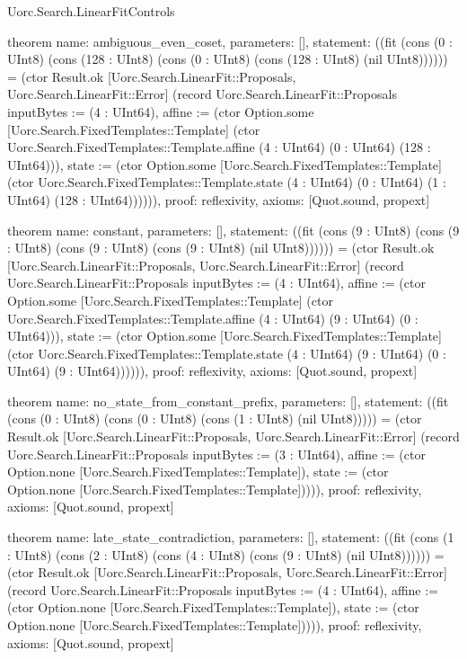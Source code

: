 \begin{lexlean}{Uorc.Search.LinearFitControls}
\begin{semanticmodule}
theorem{
  name: ambiguous_even_coset,
  parameters: [],
  statement: ((fit (cons (0 : UInt8) (cons (128 : UInt8) (cons (0 : UInt8) (cons (128 : UInt8) (nil UInt8)))))) = (ctor Result.ok [Uorc.Search.LinearFit::Proposals, Uorc.Search.LinearFit::Error] (record Uorc.Search.LinearFit::Proposals {inputBytes := (4 : UInt64), affine := (ctor Option.some [Uorc.Search.FixedTemplates::Template] (ctor Uorc.Search.FixedTemplates::Template.affine (4 : UInt64) (0 : UInt64) (128 : UInt64))), state := (ctor Option.some [Uorc.Search.FixedTemplates::Template] (ctor Uorc.Search.FixedTemplates::Template.state (4 : UInt64) (0 : UInt64) (1 : UInt64) (128 : UInt64)))}))),
  proof: reflexivity{},
  axioms: [Quot.sound, propext]
}

theorem{
  name: constant,
  parameters: [],
  statement: ((fit (cons (9 : UInt8) (cons (9 : UInt8) (cons (9 : UInt8) (cons (9 : UInt8) (nil UInt8)))))) = (ctor Result.ok [Uorc.Search.LinearFit::Proposals, Uorc.Search.LinearFit::Error] (record Uorc.Search.LinearFit::Proposals {inputBytes := (4 : UInt64), affine := (ctor Option.some [Uorc.Search.FixedTemplates::Template] (ctor Uorc.Search.FixedTemplates::Template.affine (4 : UInt64) (9 : UInt64) (0 : UInt64))), state := (ctor Option.some [Uorc.Search.FixedTemplates::Template] (ctor Uorc.Search.FixedTemplates::Template.state (4 : UInt64) (9 : UInt64) (0 : UInt64) (9 : UInt64)))}))),
  proof: reflexivity{},
  axioms: [Quot.sound, propext]
}

theorem{
  name: no_state_from_constant_prefix,
  parameters: [],
  statement: ((fit (cons (0 : UInt8) (cons (0 : UInt8) (cons (1 : UInt8) (nil UInt8))))) = (ctor Result.ok [Uorc.Search.LinearFit::Proposals, Uorc.Search.LinearFit::Error] (record Uorc.Search.LinearFit::Proposals {inputBytes := (3 : UInt64), affine := (ctor Option.none [Uorc.Search.FixedTemplates::Template]), state := (ctor Option.none [Uorc.Search.FixedTemplates::Template])}))),
  proof: reflexivity{},
  axioms: [Quot.sound, propext]
}

theorem{
  name: late_state_contradiction,
  parameters: [],
  statement: ((fit (cons (1 : UInt8) (cons (2 : UInt8) (cons (4 : UInt8) (cons (9 : UInt8) (nil UInt8)))))) = (ctor Result.ok [Uorc.Search.LinearFit::Proposals, Uorc.Search.LinearFit::Error] (record Uorc.Search.LinearFit::Proposals {inputBytes := (4 : UInt64), affine := (ctor Option.none [Uorc.Search.FixedTemplates::Template]), state := (ctor Option.none [Uorc.Search.FixedTemplates::Template])}))),
  proof: reflexivity{},
  axioms: [Quot.sound, propext]
}


\end{semanticmodule}
\end{lexlean}
